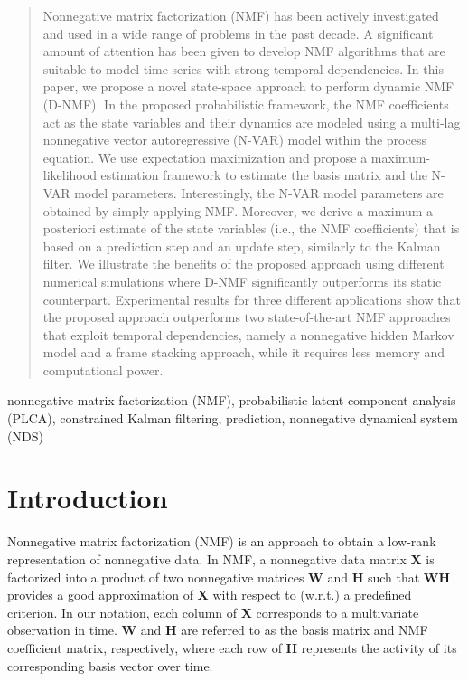 \documentclass[10pt,twocolumn,twoside] {IEEEtran}
\begin{document}
\begin{abstract}
Nonnegative matrix factorization (NMF) has been actively investigated and used in a wide range of problems in the past decade. A significant amount of attention has been given to develop NMF algorithms that are suitable to model time series with strong temporal dependencies. In this paper, we propose a novel state-space approach to perform dynamic NMF (D-NMF). In the proposed probabilistic framework, the NMF coefficients act as the state variables and their dynamics are modeled using a multi-lag nonnegative vector autoregressive (N-VAR) model within the process equation. We use expectation maximization and propose a maximum-likelihood estimation framework to estimate the basis matrix and the N-VAR model parameters. Interestingly, the N-VAR model parameters are obtained by simply applying NMF. Moreover, we derive a maximum a posteriori estimate of the state variables (i.e., the NMF coefficients) that is based on a prediction step and an update step, similarly to the Kalman filter. We illustrate the benefits of the proposed approach using different numerical simulations where D-NMF significantly outperforms its static counterpart. Experimental results for three different applications show that the proposed approach outperforms two state-of-the-art NMF approaches that exploit temporal dependencies, namely a nonnegative hidden Markov model and a frame stacking approach, while it requires less memory and computational power.
\end{abstract}

\begin{IEEEkeywords}
nonnegative matrix factorization (NMF), probabilistic latent component analysis (PLCA), constrained Kalman filtering, prediction, nonnegative dynamical system (NDS)
\end{IEEEkeywords}

\IEEEpeerreviewmaketitle


\section{Introduction\label{sec:Introduction}}

Nonnegative matrix factorization (NMF) \cite{Lee2000} is an approach
to obtain a low-rank representation of nonnegative data. In NMF,
a nonnegative data matrix $\mathbf{X}$ is factorized into a product of
two nonnegative matrices $\mathbf{W}$ and $\mathbf{H}$ such that
$\mathbf{W}\mathbf{H}$ provides a good approximation of $\mathbf{X}$ with respect to (w.r.t.) a predefined criterion.
In our notation, each column of $\mathbf{X}$ corresponds to a multivariate observation in time.
$\mathbf{W}$ and $\mathbf{H}$ are referred to as the basis matrix and NMF coefficient matrix, respectively, where each row of $\mathbf{H}$ represents the activity of its corresponding
basis vector over time.
\end{document}
